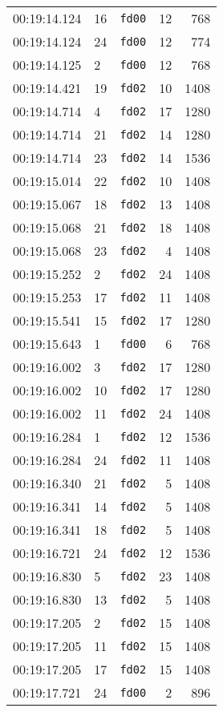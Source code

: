 \documentclass{article}
\begin{document}
\begin{longtable}{lllrr}
00:19:14.124 & 16 & \texttt{fd00} & 12 & 768 \\
00:19:14.124 & 24 & \texttt{fd00} & 12 & 774 \\
00:19:14.125 & 2 & \texttt{fd00} & 12 & 768 \\
00:19:14.421 & 19 & \texttt{fd02} & 10 & 1408 \\
00:19:14.714 & 4 & \texttt{fd02} & 17 & 1280 \\
00:19:14.714 & 21 & \texttt{fd02} & 14 & 1280 \\
00:19:14.714 & 23 & \texttt{fd02} & 14 & 1536 \\
00:19:15.014 & 22 & \texttt{fd02} & 10 & 1408 \\
00:19:15.067 & 18 & \texttt{fd02} & 13 & 1408 \\
00:19:15.068 & 21 & \texttt{fd02} & 18 & 1408 \\
00:19:15.068 & 23 & \texttt{fd02} & 4 & 1408 \\
00:19:15.252 & 2 & \texttt{fd02} & 24 & 1408 \\
00:19:15.253 & 17 & \texttt{fd02} & 11 & 1408 \\
00:19:15.541 & 15 & \texttt{fd02} & 17 & 1280 \\
00:19:15.643 & 1 & \texttt{fd00} & 6 & 768 \\
00:19:16.002 & 3 & \texttt{fd02} & 17 & 1280 \\
00:19:16.002 & 10 & \texttt{fd02} & 17 & 1280 \\
00:19:16.002 & 11 & \texttt{fd02} & 24 & 1408 \\
00:19:16.284 & 1 & \texttt{fd02} & 12 & 1536 \\
00:19:16.284 & 24 & \texttt{fd02} & 11 & 1408 \\
00:19:16.340 & 21 & \texttt{fd02} & 5 & 1408 \\
00:19:16.341 & 14 & \texttt{fd02} & 5 & 1408 \\
00:19:16.341 & 18 & \texttt{fd02} & 5 & 1408 \\
00:19:16.721 & 24 & \texttt{fd02} & 12 & 1536 \\
00:19:16.830 & 5 & \texttt{fd02} & 23 & 1408 \\
00:19:16.830 & 13 & \texttt{fd02} & 5 & 1408 \\
00:19:17.205 & 2 & \texttt{fd02} & 15 & 1408 \\
00:19:17.205 & 11 & \texttt{fd02} & 15 & 1408 \\
00:19:17.205 & 17 & \texttt{fd02} & 15 & 1408 \\
00:19:17.721 & 24 & \texttt{fd00} & 2 & 896 \\

\end{longtable}
\end{document}
